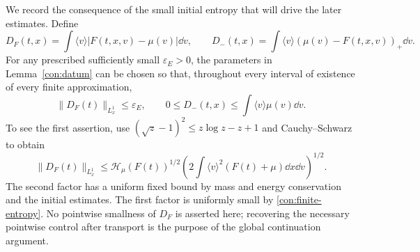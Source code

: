 We record the consequence of the small initial entropy that will drive
the later estimates.  Define
\begin{equation}
 D_F(t,x)=\int\langle v\rangle|F(t,x,v)-\mu(v)|\dd v,\qquad
 D_-(t,x)=\int\langle v\rangle(\mu(v)-F(t,x,v))_+\dd v.
 \label{con:entropy-defect}
\end{equation}
For any prescribed sufficiently small \(\varepsilon_E>0\), the
parameters in Lemma~\ref{con:datum} can be chosen so that, throughout
every interval of existence of every finite approximation,
\begin{equation}
 \|D_F(t)\|_{L^1_x}\le\varepsilon_E,\qquad
 0\le D_-(t,x)\le\int\langle v\rangle\mu(v)\dd v.
 \label{con:entropy-distance}
\end{equation}
To see the first assertion, use
\((\sqrt z-1)^2\le z\log z-z+1\) and Cauchy--Schwarz to obtain
\[
 \|D_F(t)\|_{L^1_x}
 \le\mathcal H_\mu(F(t))^{1/2}
       \left(2\int\langle v\rangle^2(F(t)+\mu)\dd x\dd v\right)^{1/2}.
\]
The second factor has a uniform fixed bound by mass and energy
conservation and the initial estimates.  The first factor is uniformly
small by \eqref{con:finite-entropy}.  No pointwise smallness of \(D_F\)
is asserted here; recovering the necessary pointwise control after
transport is the purpose of the global continuation argument.
